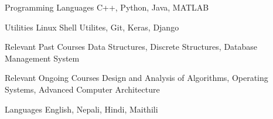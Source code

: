 

\begin{cvskills}

  \cvskill
    {Programming Languages} %
    { C++, Python, Java, MATLAB} %

  \cvskill
    {Utilities} %
    {Linux Shell Utilites, Git, Keras, Django} %


  \cvskill
    {Relevant Past Courses } %
    {Data Structures, Discrete Structures, Database Management System } %

  \cvskill
    {Relevant Ongoing Courses} %
    {Design and Analysis of Algorithms, Operating Systems, Advanced Computer Architecture} %

  \cvskill
    {Languages} %
    {English, Nepali, Hindi, Maithili} %
\end{cvskills}
